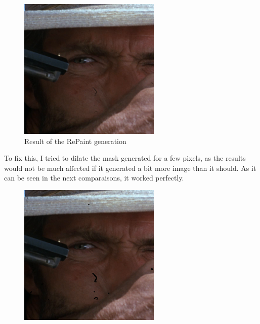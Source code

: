 \documentclass[openany, 12pt]{article}
\begin{document}
{\begin{figure}[htbp]
\begin{minipage}{0.45\textwidth}
		\includegraphics[width=\textwidth]{images/bueno_feo_malo_frame_0129_inpaint.png}
		\caption{Result of the RePaint generation}
	\end{minipage}
\end{figure}
To fix this, I tried to dilate the mask generated for a few pixels, as the results would not be much affected if it generated a bit more image than it should. As it can be seen in the next comparaisons, it worked perfectly.
\begin{figure}[htbp]
	\centering
	\begin{minipage}{0.45\textwidth}
		\centering
		\includegraphics[width=\textwidth]{images/masked_3.png}

\end{minipage}
\end{figure}}
\end{document}
